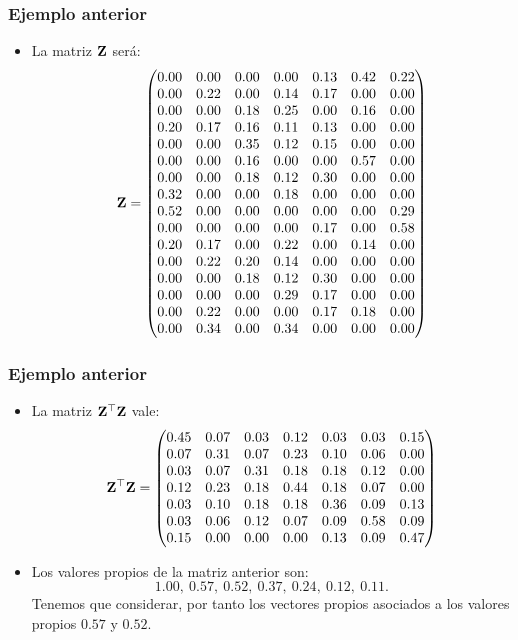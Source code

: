 \begin{frame}
\frametitle{Ejemplo anterior}
\begin{itemize}
\item<2->{La matriz $\mathbf{Z}$ será:
$$
\mathbf{Z}=\begin{pmatrix}
0.00 & 0.00 & 0.00 & 0.00 & 0.13 & 0.42 & 0.22 \\
0.00 & 0.22 & 0.00 & 0.14 & 0.17 & 0.00 & 0.00 \\
0.00 & 0.00 & 0.18 & 0.25 & 0.00 & 0.16 & 0.00 \\
0.20 & 0.17 & 0.16 & 0.11 & 0.13 & 0.00 & 0.00 \\
0.00 & 0.00 & 0.35 & 0.12 & 0.15 & 0.00 & 0.00 \\
0.00 & 0.00 & 0.16 & 0.00 & 0.00 & 0.57 & 0.00 \\
0.00 & 0.00 & 0.18 & 0.12 & 0.30 & 0.00 & 0.00 \\
0.32 & 0.00 & 0.00 & 0.18 & 0.00 & 0.00 & 0.00 \\
0.52 & 0.00 & 0.00 & 0.00 & 0.00 & 0.00 & 0.29 \\
0.00 & 0.00 & 0.00 & 0.00 & 0.17 & 0.00 & 0.58 \\
0.20 & 0.17 & 0.00 & 0.22 & 0.00 & 0.14 & 0.00 \\
0.00 & 0.22 & 0.20 & 0.14 & 0.00 & 0.00 & 0.00 \\
0.00 & 0.00 & 0.18 & 0.12 & 0.30 & 0.00 & 0.00 \\
0.00 & 0.00 & 0.00 & 0.29 & 0.17 & 0.00 & 0.00 \\
0.00 & 0.22 & 0.00 & 0.00 & 0.17 & 0.18 & 0.00 \\
0.00 & 0.34 & 0.00 & 0.34 & 0.00 & 0.00 & 0.00 
\end{pmatrix}
$$}
\end{itemize}
\end{frame}

\begin{frame}
\frametitle{Ejemplo anterior}
\begin{itemize}
\item<2->{La matriz $\mathbf{Z}^\top\mathbf{Z}$ vale:
$$
\mathbf{Z}^\top\mathbf{Z} = \begin{pmatrix}
0.45 & 0.07 & 0.03 & 0.12 & 0.03 & 0.03 & 0.15 \\
0.07 & 0.31 & 0.07 & 0.23 & 0.10 & 0.06 & 0.00 \\
0.03 & 0.07 & 0.31 & 0.18 & 0.18 & 0.12 & 0.00 \\
0.12 & 0.23 & 0.18 & 0.44 & 0.18 & 0.07 & 0.00 \\
0.03 & 0.10 & 0.18 & 0.18 & 0.36 & 0.09 & 0.13 \\
0.03 & 0.06 & 0.12 & 0.07 & 0.09 & 0.58 & 0.09 \\
0.15 & 0.00 & 0.00 & 0.00 & 0.13 & 0.09 & 0.47 
\end{pmatrix}
$$}
\item<3->{Los valores propios de la matriz anterior son:
$$
1.00,\   0.57,\   0.52,\   0.37,\   0.24,\   0.12,\   0.11.
$$Tenemos que considerar, por tanto los vectores propios asociados a los valores propios $0.57$ y $0.52$.
}
\end{itemize}
\end{frame}

